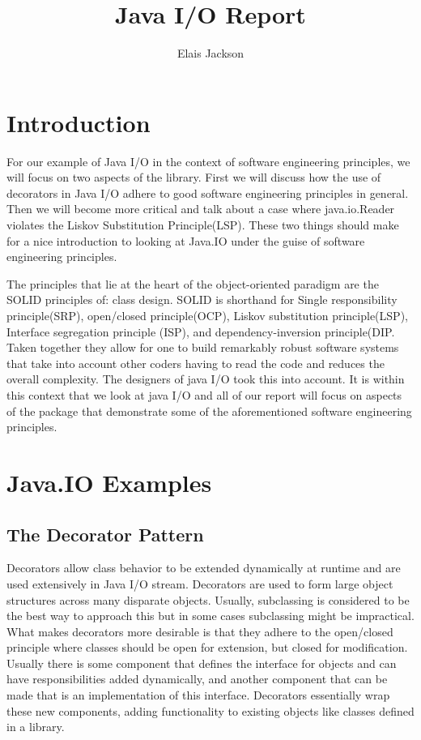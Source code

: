 \documentclass[12pt]{article}
\title{Java I/O Report}
\author{Elais Jackson}
\begin{document}
\maketitle
\section{Introduction}

For our example of Java I/O in the context of software engineering principles, we will focus on two aspects of the library. First we will discuss how the use of decorators in Java I/O adhere to good software engineering principles in general. Then we will become more critical and talk about a case where java.io.Reader violates the Liskov Substitution Principle(LSP). These two things should make for a nice introduction to looking at Java.IO under the guise of software engineering principles.

The principles that lie at the heart of the object-oriented paradigm are the SOLID principles of: class design. SOLID is shorthand for Single responsibility principle(SRP), open/closed principle(OCP), Liskov substitution principle(LSP), Interface segregation principle (ISP), and dependency-inversion principle(DIP. Taken together they allow for one to build remarkably robust software systems that take into account other coders having to read the code and reduces the overall complexity. The designers of java I/O took this into account. It is within this context that we look at java I/O and all of our report will focus on aspects of the package that demonstrate some of the aforementioned software engineering principles.

\section{Java.IO Examples}
\subsection{The Decorator Pattern}
Decorators allow class behavior to be extended dynamically at runtime and are used extensively in Java I/O stream. Decorators are used to form large object structures across many disparate objects. Usually, subclassing is considered to be the best way to approach this but in some cases subclassing might be impractical. What makes decorators more desirable is that they adhere to the open/closed principle where classes should be open for extension, but closed for modification. Usually there is some component that defines the interface for objects and can have responsibilities added dynamically, and another component that can be made that is an implementation of this interface. Decorators essentially wrap these new components, adding functionality to existing objects like classes defined in a library.
\end{document}
